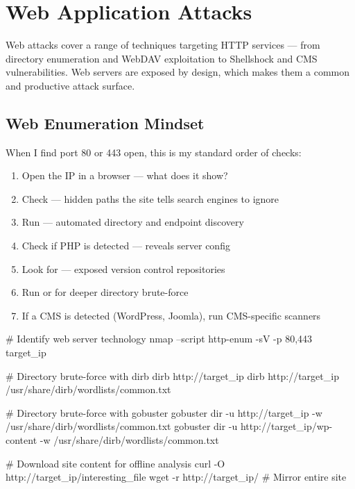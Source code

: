 \chapter{Web Application Attacks}
\label{ch:web_attacks}

Web attacks cover a range of techniques targeting HTTP services --- from directory
enumeration and WebDAV exploitation to Shellshock and CMS vulnerabilities.
Web servers are exposed by design, which makes them a common and productive
attack surface.

\section{Web Enumeration Mindset}
\label{sec:web_enum_mindset}

When I find port 80 or 443 open, this is my standard order of checks:

\begin{enumerate}
  \item Open the IP in a browser --- what does it show?
  \item Check  --- hidden paths the site tells search engines
        to ignore
  \item Run  --- automated directory and endpoint
        discovery
  \item Check  if PHP is detected --- reveals server config
  \item Look for  --- exposed version control repositories
  \item Run  or  for deeper directory brute-force
  \item If a CMS is detected (WordPress, Joomla), run CMS-specific scanners
\end{enumerate}

\begin{termbox}
# Identify web server technology
nmap --script http-enum -sV -p 80,443 target_ip

# Directory brute-force with dirb
dirb http://target_ip
dirb http://target_ip /usr/share/dirb/wordlists/common.txt

# Directory brute-force with gobuster
gobuster dir -u http://target_ip -w /usr/share/dirb/wordlists/common.txt
gobuster dir -u http://target_ip/wp-content -w /usr/share/dirb/wordlists/common.txt

# Download site content for offline analysis
curl -O http://target_ip/interesting_file
wget -r http://target_ip/    # Mirror entire site
\end{termbox}

